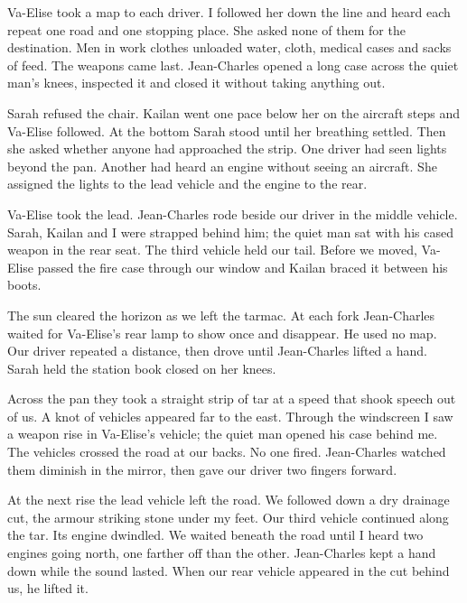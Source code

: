 Va-Elise took a map to each driver. I followed her down the line and heard each repeat one road and one stopping place. She asked none of them for the destination. Men in work clothes unloaded water, cloth, medical cases and sacks of feed. The weapons came last. Jean-Charles opened a long case across the quiet man's knees, inspected it and closed it without taking anything out.\par

Sarah refused the chair. Kailan went one pace below her on the aircraft steps and Va-Elise followed. At the bottom Sarah stood until her breathing settled. Then she asked whether anyone had approached the strip. One driver had seen lights beyond the pan. Another had heard an engine without seeing an aircraft. She assigned the lights to the lead vehicle and the engine to the rear.\par

Va-Elise took the lead. Jean-Charles rode beside our driver in the middle vehicle. Sarah, Kailan and I were strapped behind him; the quiet man sat with his cased weapon in the rear seat. The third vehicle held our tail. Before we moved, Va-Elise passed the fire case through our window and Kailan braced it between his boots.\par

The sun cleared the horizon as we left the tarmac. At each fork Jean-Charles waited for Va-Elise's rear lamp to show once and disappear. He used no map. Our driver repeated a distance, then drove until Jean-Charles lifted a hand. Sarah held the station book closed on her knees.\par

Across the pan they took a straight strip of tar at a speed that shook speech out of us. A knot of vehicles appeared far to the east. Through the windscreen I saw a weapon rise in Va-Elise's vehicle; the quiet man opened his case behind me. The vehicles crossed the road at our backs. No one fired. Jean-Charles watched them diminish in the mirror, then gave our driver two fingers forward.\par

At the next rise the lead vehicle left the road. We followed down a dry drainage cut, the armour striking stone under my feet. Our third vehicle continued along the tar. Its engine dwindled. We waited beneath the road until I heard two engines going north, one farther off than the other. Jean-Charles kept a hand down while the sound lasted. When our rear vehicle appeared in the cut behind us, he lifted it.\par

